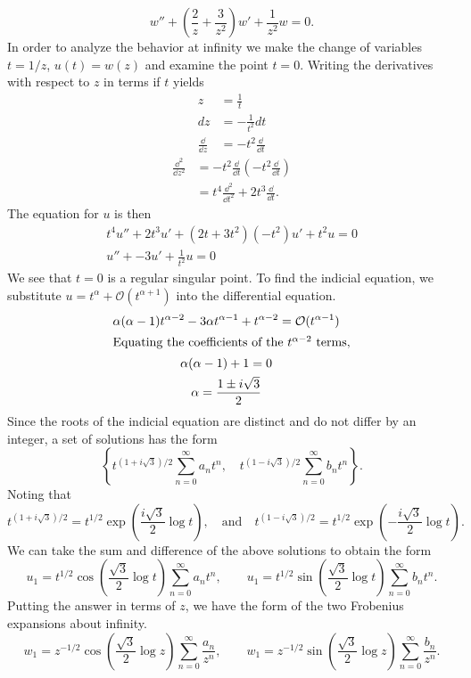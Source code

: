 {%
\begin{Solution}
  \label{solution w2z3zw1zw=0}
  \[ w'' + \left(\frac{2}{z}+ \frac{3}{z^2} \right)w' + \frac{1}{z^2} w = 0. \]
  In order to analyze the behavior at infinity we make the change of
  variables $t = 1/z$, $u(t) = w(z)$ and examine the point $t = 0$.
  Writing the derivatives with respect to $z$ in terms if $t$ yields
  \begin{align*}
    z       &= \frac{1}{t} \\
    d z      &= -\frac{1}{t^2} d t \\
    \frac{\dd}{\dd z}    &= - t^2 \frac{\dd}{\dd t}
  \end{align*}
  \begin{align*}
    \frac{\dd^2}{\dd z^2}    &= -t^2 \frac{\dd}{\dd t} \left( - t^2 \frac{\dd}{\dd t} \right) \\
    &= t^4 \frac{\dd^2}{\dd t^2} + 2 t^3 \frac{\dd}{\dd t}.
  \end{align*}
  The equation for $u$ is then
  \begin{gather*}
    t^4 u'' + 2 t^3 u' + (2t + 3 t^2)(-t^2)u' + t^2 u = 0 \\
    u'' + -3 u' + \frac{1}{t^2} u = 0
  \end{gather*}
  We see that $t=0$ is a regular singular point.  To find the indicial
  equation, we substitute $u = t^\alpha + \mathcal{O}(t^{\alpha+1})$ 
  into the differential
  equation.
  \begin{gather*}
    \alpha(\alpha-1)t^{\alpha-2} - 3 \alpha t^{\alpha-1} + t^{\alpha-2} =
    \mathcal{O}(t^{\alpha-1}) \\
    \intertext{Equating the coefficients of the $t^{\alpha-2}$ terms,}
    \alpha(\alpha-1) + 1 = 0 \\
    \alpha = \frac{1 \pm i \sqrt{3}}{2}
  \end{gather*}
  Since the roots of the indicial equation are distinct and do not differ by
  an integer, a set of solutions has the form
  \[ \left\{ t^{(1+i\sqrt{3})/2} \sum_{n=0}^\infty a_n t^n, \quad
    t^{(1-i\sqrt{3})/2} \sum_{n=0}^\infty b_n t^n \right\}. \]
  Noting that
  \[ t^{(1+i\sqrt{3})/2} = t^{1/2} \exp\left(\frac{i\sqrt{3}}{2} \log t\right),
  \quad \mathrm{and} \quad
  t^{(1-i\sqrt{3})/2} = t^{1/2} \exp\left(-\frac{i\sqrt{3}}{2} \log t\right). \]
  We can take the sum and difference of the above solutions to obtain the
  form
  \[ u_1 = t^{1/2} \cos\left( \frac{\sqrt{3}}{2} \log t \right)
  \sum_{n=0}^\infty a_n t^n,
  \qquad
  u_1 = t^{1/2} \sin\left( \frac{\sqrt{3}}{2} \log t \right)
  \sum_{n=0}^\infty b_n t^n. \]
  Putting the answer in terms of $z$, we have the form of the two Frobenius
  expansions about infinity.
  \[ \boxed{ w_1 = z^{-1/2} \cos\left(\frac{\sqrt{3}}{2} \log z \right)
    \sum_{n=0}^\infty \frac{a_n}{z^n}, \qquad
    w_1 = z^{-1/2} \sin\left(\frac{\sqrt{3}}{2} \log z \right)
    \sum_{n=0}^\infty \frac{b_n}{z^n}. } \]
\end{Solution}






}
